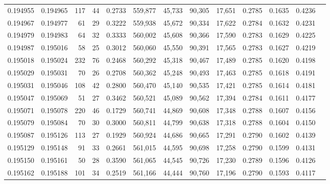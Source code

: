 \begin{tabular}{rrrrrrrrrrrrr}
0.194955 & 0.194965 &   117 &  44 &                                     0.2733 & 559,877 &  45,733 &  90,305 &  17,651 & 0.2785 & 0.1635 & 0.4236 \\
0.194967 & 0.194977 &    61 &  29 &                                     0.3222 & 559,938 &  45,672 &  90,334 &  17,622 & 0.2784 & 0.1632 & 0.4231 \\
0.194979 & 0.194983 &    64 &  32 &                                     0.3333 & 560,002 &  45,608 &  90,366 &  17,590 & 0.2783 & 0.1629 & 0.4225 \\
0.194987 & 0.195016 &    58 &  25 &                                     0.3012 & 560,060 &  45,550 &  90,391 &  17,565 & 0.2783 & 0.1627 & 0.4219 \\
0.195018 & 0.195024 &   232 &  76 &                                     0.2468 & 560,292 &  45,318 &  90,467 &  17,489 & 0.2785 & 0.1620 & 0.4198 \\
0.195029 & 0.195031 &    70 &  26 &                                     0.2708 & 560,362 &  45,248 &  90,493 &  17,463 & 0.2785 & 0.1618 & 0.4191 \\
0.195031 & 0.195046 &   108 &  42 &                                     0.2800 & 560,470 &  45,140 &  90,535 &  17,421 & 0.2785 & 0.1614 & 0.4181 \\
0.195047 & 0.195069 &    51 &  27 &                                     0.3462 & 560,521 &  45,089 &  90,562 &  17,394 & 0.2784 & 0.1611 & 0.4177 \\
0.195071 & 0.195078 &   220 &  46 &                                     0.1729 & 560,741 &  44,869 &  90,608 &  17,348 & 0.2788 & 0.1607 & 0.4156 \\
0.195079 & 0.195084 &    70 &  30 &                                     0.3000 & 560,811 &  44,799 &  90,638 &  17,318 & 0.2788 & 0.1604 & 0.4150 \\
0.195087 & 0.195126 &   113 &  27 &                                     0.1929 & 560,924 &  44,686 &  90,665 &  17,291 & 0.2790 & 0.1602 & 0.4139 \\
0.195129 & 0.195148 &    91 &  33 &                                     0.2661 & 561,015 &  44,595 &  90,698 &  17,258 & 0.2790 & 0.1599 & 0.4131 \\
0.195150 & 0.195161 &    50 &  28 &                                     0.3590 & 561,065 &  44,545 &  90,726 &  17,230 & 0.2789 & 0.1596 & 0.4126 \\
0.195162 & 0.195188 &   101 &  34 &                                     0.2519 & 561,166 &  44,444 &  90,760 &  17,196 & 0.2790 & 0.1593 & 0.4117 \\

\end{tabular}
